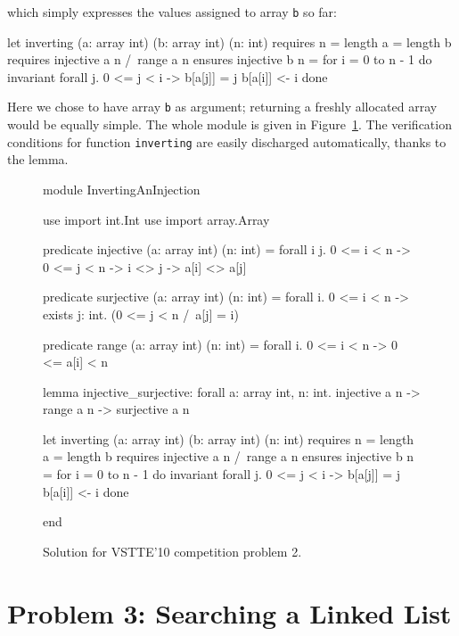 which simply expresses the values assigned to array \texttt{b} so far:
\begin{whycode}
  let inverting (a: array int) (b: array int) (n: int)
    requires { n = length a = length b }
    requires { injective a n /\ range a n }
    ensures  { injective b n }
  = for i = 0 to n - 1 do
      invariant { forall j. 0 <= j < i -> b[a[j]] = j }
      b[a[i]] <- i
    done
\end{whycode}
Here we chose to have array \texttt{b} as argument; returning a
freshly allocated array would be equally simple.
The whole module is given in Figure~\ref{fig:Inverting}.
The verification conditions for function \texttt{inverting} are easily
discharged automatically, thanks to the lemma.
\begin{figure}
  \centering
\begin{whycode}
module InvertingAnInjection

  use import int.Int
  use import array.Array

  predicate injective (a: array int) (n: int) =
    forall i j. 0 <= i < n -> 0 <= j < n -> i <> j -> a[i] <> a[j]

  predicate surjective (a: array int) (n: int) =
    forall i. 0 <= i < n -> exists j: int. (0 <= j < n /\ a[j] = i)

  predicate range (a: array int) (n: int) =
    forall i. 0 <= i < n -> 0 <= a[i] < n

  lemma injective_surjective:
    forall a: array int, n: int.
      injective a n -> range a n -> surjective a n

  let inverting (a: array int) (b: array int) (n: int)
    requires { n = length a = length b }
    requires { injective a n /\ range a n }
    ensures  { injective b n }
  = for i = 0 to n - 1 do
      invariant { forall j. 0 <= j < i -> b[a[j]] = j }
      b[a[i]] <- i
    done

end
\end{whycode}
\vspace*{-1em}%
  \caption{Solution for VSTTE'10 competition problem 2.}
  \label{fig:Inverting}
\end{figure}

\section{Problem 3: Searching a Linked List}

